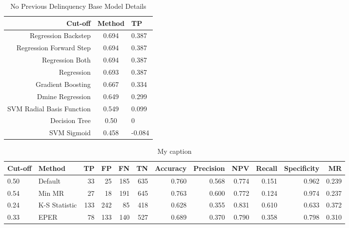 \begin{table}[H]
	\centering
	\begin{tabular}{r | c | l}
		\hline
		\textbf{Cut-off} & \textbf{Method} & \textbf{TP} \\
		\hline
		Regression Backstep          & 0.694        & 0.387 \\
		Regression Forward Step          & 0.694        & 0.387 \\
		Regression Both          & 0.694        & 0.387 \\
		Regression          & 0.693        & 0.387 \\
		Gradient Boosting          & 0.667        & 0.334 \\
		Dmine Regression          & 0.649        & 0.299 \\
		SVM Radial Basis Function          & 0.549        & 0.099 \\
		Decision Tree          & 0.50        & 0 \\
		SVM Sigmoid         & 0.458        & -0.084 \\
		\hline
	\end{tabular}
	\caption{No Previous Delinquency Base Model Details}
\end{table}


\begin{table}[]
	\centering
	\resizebox{\textwidth}{!}
	{
	\begin{tabular}{l|l|r|r|r|r|r|r|r|r|r|r}
		\hline
		\textbf{Cut-off} & \textbf{Method}                                                         & \textbf{TP} & \textbf{FP} & \textbf{FN} & \textbf{TN} & \textbf{Accuracy} & \textbf{Precision} & \textbf{NPV} & \textbf{Recall} & \textbf{Specificity} & \textbf{MR}
		 \\ \hline
		0.50            & Default                                                                 & 33          & 25          & 185         & 635         & 0.760             & 0.568              & 0.774        & 0.151           & 0.962                & 0.239       \\
		0.54            & Min MR                                                                  & 27          & 18          & 191         & 645         & 0.763             & 0.600              & 0.772        & 0.124           & 0.974                & 0.237       \\
		0.24            & K-S Statistic                                                           & 133         & 242         & 85          & 418         & 0.628             & 0.355              & 0.831        & 0.610           & 0.633                & 0.372       \\
		0.33            & EPER & 78          & 133         & 140         & 527         & 0.689             & 0.370              & 0.790        & 0.358           & 0.798                & 0.310    \\
		\hline  
	\end{tabular}
	}
	\caption{My caption}
	\label{my-label}
\end{table}

